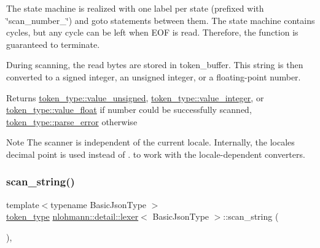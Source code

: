 

The state machine is realized with one label per state (prefixed with \char`\"{}scan\+\_\+number\+\_\+\char`\"{}) and {\ttfamily goto} statements between them. The state machine contains cycles, but any cycle can be left when E\+OF is read. Therefore, the function is guaranteed to terminate.

During scanning, the read bytes are stored in token\+\_\+buffer. This string is then converted to a signed integer, an unsigned integer, or a floating-\/point number.

\begin{DoxyReturn}{Returns}
\mbox{\hyperlink{classnlohmann_1_1detail_1_1lexer_a3f313cdbe187cababfc5e06f0b69b098aaf1f040fcd2f674d2e5893d7a731078f}{token\+\_\+type\+::value\+\_\+unsigned}}, \mbox{\hyperlink{classnlohmann_1_1detail_1_1lexer_a3f313cdbe187cababfc5e06f0b69b098a5064b6655d88a50ae16665cf7751c0ee}{token\+\_\+type\+::value\+\_\+integer}}, or \mbox{\hyperlink{classnlohmann_1_1detail_1_1lexer_a3f313cdbe187cababfc5e06f0b69b098a0d2671a6f81efb91e77f6ac3bdb11443}{token\+\_\+type\+::value\+\_\+float}} if number could be successfully scanned, \mbox{\hyperlink{classnlohmann_1_1detail_1_1lexer_a3f313cdbe187cababfc5e06f0b69b098a456e19aeafa334241c7ff3f589547f9d}{token\+\_\+type\+::parse\+\_\+error}} otherwise
\end{DoxyReturn}
\begin{DoxyNote}{Note}
The scanner is independent of the current locale. Internally, the locale\textquotesingle{}s decimal point is used instead of {\ttfamily .} to work with the locale-\/dependent converters. 
\end{DoxyNote}
\mbox{\label{classnlohmann_1_1detail_1_1lexer_ad271045d1c91df9d6a119482b4aeae7f}} 
\subsubsection{\texorpdfstring{scan\_string()}{scan\_string()}}
{\footnotesize\ttfamily template$<$typename Basic\+Json\+Type $>$ \\
\mbox{\hyperlink{classnlohmann_1_1detail_1_1lexer_a3f313cdbe187cababfc5e06f0b69b098}{token\+\_\+type}} \mbox{\hyperlink{classnlohmann_1_1detail_1_1lexer}{nlohmann\+::detail\+::lexer}}$<$ Basic\+Json\+Type $>$\+::scan\+\_\+string (\begin{DoxyParamCaption}{ }\end{DoxyParamCaption})\hspace{0.3cm}{\ttfamily [inline]}, {\ttfamily [private]}}



